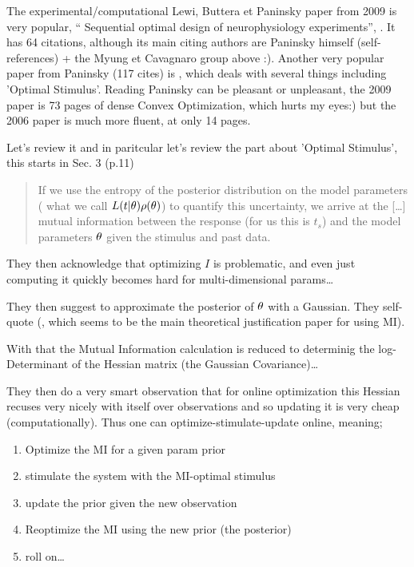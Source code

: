 The experimental/computational Lewi, Buttera et Paninsky paper from 2009 is
very popular, `` Sequential
optimal design of neurophysiology experiments'', \cite{Lewi2009}. It has 64
citations, although its main citing authors are Paninsky himself
(self-references) + the Myung et Cavagnaro group above :). Another very popular
paper from Paninsky (117 cites) is \cite{Paninski2006a}, which deals with
several things including 'Optimal Stimulus'. Reading Paninsky can be pleasant or
unpleasant, the 2009 \cite{Lewi2009}paper is 73 pages of dense Convex
Optimization, which hurts my eyes:) but the 2006 paper is much more fluent, at
only 14 pages. 

Let's review it and in paritcular let's review the part about 'Optimal
Stimulus', this starts in Sec. 3 (p.11)

\begin{quote}
If we use the entropy of the posterior
distribution on the model parameters ( what we call $L(t|{ \theta})
\rho({ \theta})$) to quantify this uncertainty, we arrive at the [\ldots] 
mutual information between the response (for us this is $t_s$) and the model
parameters ${ \theta}$ given the stimulus and past data.  
\end{quote}

They then acknowledge that optimizing $I$ is problematic, and even just
computing it quickly becomes hard for multi-dimensional params\ldots

They then suggest to approximate the posterior of ${ \theta}$ with a Gaussian. They
self-quote (\cite{Paninski2005}, which seems to be the main theoretical
justification paper for using MI).

With that the Mutual Information calculation is reduced to determinig the
log-Determinant of the Hessian matrix (the Gaussian Covariance)\ldots

They then do a very smart observation that for online optimization this Hessian
recuses very nicely with itself over observations and so updating it is very
cheap (computationally). Thus one can optimize-stimulate-update online, meaning;

\begin{enumerate}
  \item Optimize the MI for a given param prior
  \item stimulate the system with the MI-optimal stimulus
  \item update the prior given the new observation
  \item Reoptimize the MI using the new prior (the posterior)
  \item roll on\ldots
\end{enumerate}

